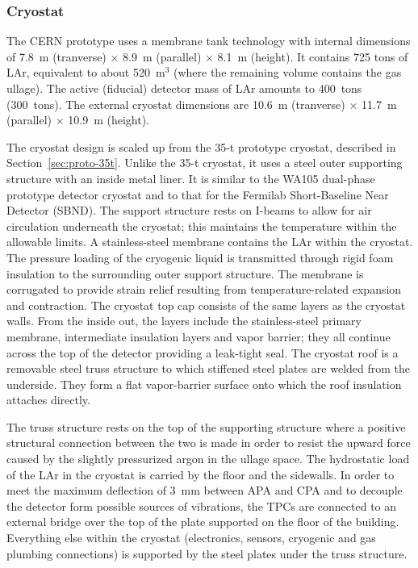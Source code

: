 \subsubsection{Cryostat}

The CERN prototype uses a membrane tank technology with internal
dimensions of 7.8~m (tranverse) $\times$ 8.9~m (parallel) $\times$ 8.1~m
(height).  It contains 725 tons of LAr, equivalent to about
520~m$^3$ (where the remaining volume contains the gas ullage). 
The active (fiducial) detector mass of LAr amounts to
400~tons (300~tons).  The external cryostat dimensions are 10.6~m
(tranverse) $\times$ 11.7~m (parallel) $\times$ 10.9~m (height).

The cryostat design is scaled up from the 35-t prototype
cryostat\cite{bib:membcryo1573}, described in
Section~\ref{sec:proto-35t}.  Unlike the 35-t cryostat, it uses a
steel outer supporting structure with an inside metal liner.  It is
similar to the WA105 dual-phase prototype detector cryostat and to
that for the Fermilab Short-Baseline Near Detector
(SBND)\cite{bib:SBND}.  The support structure rests on I-beams to
allow for air circulation underneath the cryostat; this maintains the
temperature within the allowable limits.  A stainless-steel membrane
contains the LAr within the cryostat. The pressure loading of the
cryogenic liquid is transmitted through rigid foam insulation to the
surrounding outer support structure. The membrane is corrugated to
provide strain relief resulting from temperature-related expansion and
contraction. The cryostat top cap consists of the same layers as the
cryostat walls.  From the inside out, the layers include the
stainless-steel primary membrane, intermediate insulation layers and
vapor barrier; they all continue across the top of the detector
providing a leak-tight seal.  The cryostat roof is a removable steel
truss structure to which stiffened steel plates are welded from the
underside. They form a flat vapor-barrier surface onto which the roof
insulation attaches directly.


The truss structure rests on the top of the supporting structure where
a positive structural connection between the two is made in order to
resist the upward force caused by the slightly pressurized argon in
the ullage space. The hydrostatic load of the LAr in the cryostat is
carried by the floor and the sidewalls. In order to meet the maximum
deflection of 3~mm between APA and CPA and to decouple the detector
form possible sources of vibrations, the TPCs are connected to an
external bridge over the top of the plate supported on the floor of
the building. Everything else within the cryostat (electronics,
sensors, cryogenic and gas plumbing connections) is supported by the
steel plates under the truss structure.

